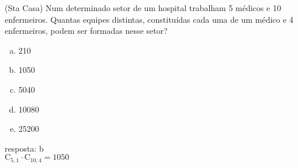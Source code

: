 \begin{ex}
 (Sta Casa) Num determinado setor de um hospital trabalham 5 médicos e 10 enfermeiros. Quantas equipes distintas, constituídas cada uma de um médico e 4 enfermeiros, podem ser formadas nesse setor?   
    \begin{enumerate}[(a)]
    \item 210
    \item 1050
    \item 5040
    \item 10080
    \item 25200
    \end{enumerate}
      \begin{sol}
       resposta: b \\
       $\mathrm{C}_{5,1}\cdot\mathrm{C}_{{10},4}=1050$
      \end{sol}
\end{ex}